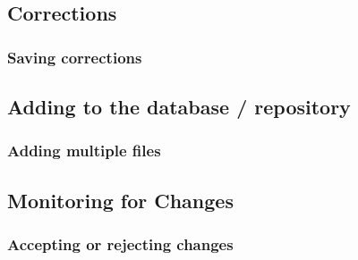 \documentclass[a4paper,12pt]{article}
\begin{document}
   \subsection{Corrections}
      
      \subsubsection{Saving corrections}

    \subsection{Adding to the database / repository}
      
      \subsubsection{Adding multiple files}

    \subsection{Monitoring for Changes}

      \subsubsection{Accepting or rejecting changes}
\end{document}
